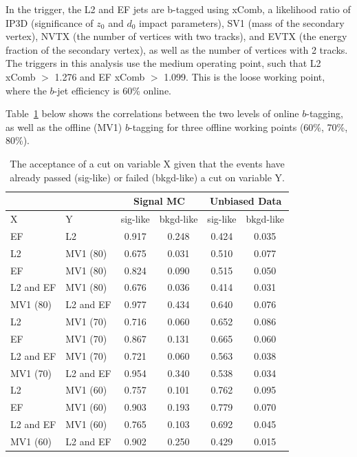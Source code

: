 In the trigger, the L2 and EF jets are b-tagged using xComb, a likelihood ratio of IP3D 
(significance of $z_0$ and $d_0$ impact parameters), SV1 (mass of the secondary vertex), NVTX (the number of
vertices with two tracks), and EVTX (the energy fraction of the secondary vertex), as well as the number
of vertices with 2 tracks. The triggers in this analysis use the medium operating point, such that L2 xComb
$>$ 1.276 and EF xComb $>$ 1.099.  This is the loose working point, where the $b$-jet efficiency
is 60\% online.

Table~\ref{tab:online_offline_btag} below shows the correlations between the two levels of online
$b$-tagging, as well as the offline (MV1) $b$-tagging for three offline working points (60\%, 70\%,
80\%).  

  \begin{table}[hbt]
\caption{  The acceptance of a cut on variable X given that the events have
  already passed (sig-like) or failed (bkgd-like) a cut on variable Y.\label{tab:online_offline_btag}}
    
    \begin{center}
    \begin{tabular}{l | l | c | c || c | c } \hline \hline
    \multicolumn{2}{c}{}  & \multicolumn{2}{c}{Signal MC} & \multicolumn{2}{c}{Unbiased Data} \\ \hline
      X         & Y         & sig-like & bkgd-like   &   sig-like & bkgd-like \\
      \hline
      EF        & L2        & 0.917    & 0.248 &   0.424       & 0.035 \\
      \hline
      L2        & MV1 (80)  & 0.675    & 0.031 &       0.510       & 0.077 \\
      EF        & MV1 (80)  & 0.824    & 0.090 & 0.515       & 0.050\\
      L2 and EF & MV1 (80)  & 0.676    & 0.036 & 0.414       & 0.031 \\
      MV1 (80)  & L2 and EF & 0.977    & 0.434 & 0.640       & 0.076 \\
      \hline
      L2        & MV1 (70)  & 0.716    & 0.060 & 0.652       & 0.086\\
      EF        & MV1 (70)  & 0.867    & 0.131 & 0.665       & 0.060 \\
      L2 and EF & MV1 (70)  & 0.721    & 0.060 & 0.563       & 0.038\\
      MV1 (70)  & L2 and EF & 0.954    & 0.340 & 0.538       & 0.034\\
      \hline
      L2        & MV1 (60)  & 0.757    & 0.101 & 0.762       & 0.095\\
      EF        & MV1 (60)  & 0.903    & 0.193 & 0.779       & 0.070 \\
      L2 and EF & MV1 (60)  & 0.765    & 0.103 & 0.692       & 0.045\\
      MV1 (60)  & L2 and EF & 0.902    & 0.250 & 0.429       & 0.015\\ \hline
    \end{tabular}
    \\
    \vspace{2mm}
    \end{center}
  \end{table}
  


